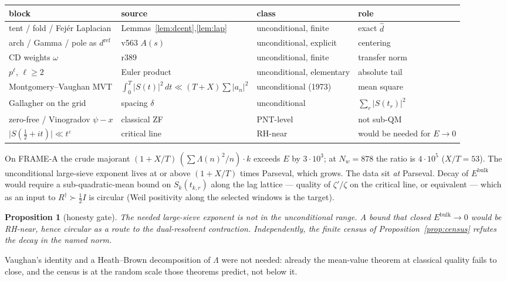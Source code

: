 \documentclass[11pt]{article}
\newtheorem{prop}{Proposition}
\theoremstyle{remark}
\newcommand{\eps}{\varepsilon}
\newcommand{\dhat}{\widehat{d}}
\begin{document}
\begin{center}
\small
\begin{tabular}{@{}llll@{}}
\toprule
block & source & class & role \\
\midrule
tent / fold / Fej\'er Laplacian
  & Lemmas~\ref{lem:dcent},\ref{lem:lap}
  & unconditional, finite
  & exact $\dhat$ \\
arch / Gamma / pole as $d^{\mathrm{ref}}$
  & v563 $A(s)$
  & unconditional, explicit
  & centering \\
CD weights $\omega$
  & r389
  & unconditional, finite
  & transfer norm \\
$p^\ell$, $\ell\ge 2$
  & Euler product
  & unconditional, elementary
  & absolute tail \\
Montgomery--Vaughan MVT
  & $\int_0^T\lvert S(t)\rvert^2\,dt\ll(T+X)\sum\lvert a_n\rvert^2$
  & unconditional (1973)
  & mean square \\
Gallagher on the grid
  & spacing $\delta$
  & unconditional
  & $\sum_r\lvert S(t_r)\rvert^2$ \\
zero-free / Vinogradov $\psi-x$
  & classical ZF
  & PNT-level
  & not sub-QM \\
$\lvert S(\tfrac12+it)\rvert\ll t^\eps$
  & critical line
  & RH-near
  & would be needed for $E\to0$ \\
\bottomrule
\end{tabular}
\end{center}

On FRAME-A the crude majorant
$(1+X/T)\,(\sum\Lambda(n)^2/n)\cdot k$ exceeds $E$ by
$3\cdot10^3$; at $N_w=878$ the ratio is $4\cdot10^5$
($X/T=53$).
The unconditional large-sieve exponent lives at or above
$(1+X/T)$ times Parseval, which grows.
The data sit \emph{at} Parseval.
Decay of $E^{\mathrm{bulk}}$ would require a sub-quadratic-mean
bound on $S_k(t_{k,r})$ along the lag lattice --- quality of
$\zeta'/\zeta$ on the critical line, or equivalent --- which
as an input to $R^\dagger\succ\tfrac12 I$ is circular
(Weil positivity along the selected windows is the target).

\begin{prop}[honesty gate]\label{prop:gate}
The needed large-sieve exponent is not in the unconditional
range.
A bound that closed $E^{\mathrm{bulk}}\to0$ would be RH-near,
hence circular as a route to the dual-resolvent contraction.
Independently, the finite census of
Proposition~\ref{prop:census} refutes the decay in the
named norm.
\end{prop}

Vaughan's identity and a Heath--Brown decomposition of
$\Lambda$ were not needed: already the mean-value theorem at
classical quality fails to close, and the census is at the
random scale those theorems predict, not below it.
\end{document}
